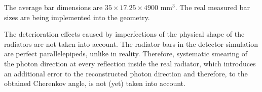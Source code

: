 The average bar dimensions are $35 \times 17.25 \times 4900 $ mm$^3$. The real measured bar sizes are being implemented into the geometry. 

The deterioration effects caused by imperfections of the physical shape of the radiators are not taken into account. The radiator bars in the detector simulation are perfect parallelepipeds, unlike in reality. Therefore, systematic smearing of the photon direction at every reflection inside the real radiator, which introduces an additional error to the reconstructed photon direction and therefore, to the obtained Cherenkov angle, is not (yet) taken into account.
